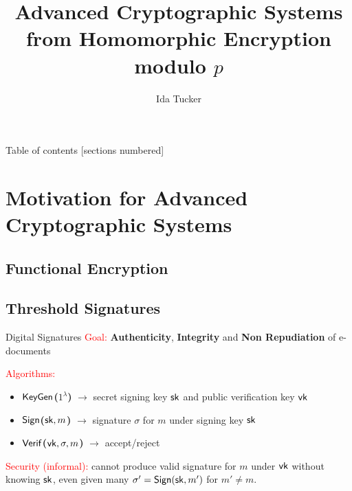 \documentclass[10pt]{beamer}
\title{Advanced Cryptographic Systems\\ 
from Homomorphic Encryption modulo \texorpdfstring{$p$}{p}}
\date{}
\author{Ida Tucker\inst{}}
\institute{\inst{}Guilhem Castagnos \& Fabien Laguillaumie
}
\begin{document}
\maketitle

\begin{frame}{Table of contents}
  [sections numbered]
  \tableofcontents[hideallsubsections]
\end{frame}

\section{Motivation for Advanced Cryptographic Systems}
\subsection{Functional Encryption}




%


\subsection{Threshold Signatures}
\begin{frame}{Digital Signatures}
\textcolor{red}{Goal:} \textbf{Authenticity}, \textbf{Integrity} and \textbf{Non Repudiation} of e-documents

\textcolor{red}{Algorithms:} 
\begin{itemize}
\item \textcolor{mLightBrown}{\textbf{$\mathsf{KeyGen}$($1^\lambda$)}} $\rightarrow$ secret signing key $\mathsf{sk}$ and public verification key $\mathsf{vk}$
\item \textcolor{mLightBrown}{\textbf{$\mathsf{Sign}$($\mathsf{sk},m$)}} $\rightarrow$ signature $\sigma$ for $m$ under signing key $\mathsf{sk}$
\item \textcolor{mLightBrown}{\textbf{$\mathsf{Verif}$($\mathsf{vk},\sigma, m$)}} $\rightarrow$ \textsf{accept}/\textsf{reject}
\end{itemize}
\textcolor{red}{Security (informal):} cannot produce valid signature for $m$ under $\mathsf{vk}$ without knowing $\mathsf{sk}$, even given many $\sigma'=\mathsf{Sign}(\mathsf{sk},m')$ for $m'\neq m$.
\end{frame}
\end{document}
